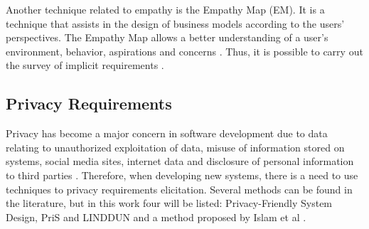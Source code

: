 \documentclass[conference]{IEEEtran}
\begin{document}

Another technique related to empathy is the Empathy Map (EM). It is a technique that assists in the design of business models according to the users' perspectives. The Empathy Map allows a better understanding of a user's environment, behavior, aspirations and concerns \cite{DBLP:conf/hci/FerreiraBC16}. Thus, it is possible to carry out the survey of implicit requirements \cite{DBLP:conf/re/LevyH18}.

\subsection{Privacy Requirements}


Privacy has become a major concern in software development due to data relating to unauthorized exploitation of data, misuse of information stored on systems, social media sites, internet data and disclosure of personal information to third parties \cite{DBLP:conf/wer/2019}. Therefore, when developing new systems, there is a need to use techniques to privacy requirements elicitation. Several methods can be found in the literature, but in this work four will be listed: Privacy-Friendly System Design, PriS and LINDDUN \cite{DBLP:conf/IEEEares/Beckers12} and a method proposed by Islam et al \cite{DBLP:journals/tcc/IslamOKMG18}.

\end{document}
